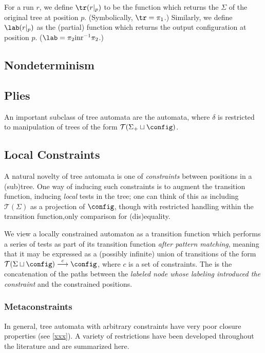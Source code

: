 For a run $r$, we define $\tr(r|_p)$ to be the function which returns the
$\Sigma$ of the original tree at position $p$. (Symbolically, $\tr =
\pi_1$.)
Similarly, we define 
$\lab(r|_p)$ as the (partial) function which returns
the output configuration at position $p$. ($\lab = \pi_2 \mbox{inr}^{-1}
\pi_2$.)

\subsection{Nondeterminism}

\subsection{Plies}

An important subclass of tree automata are the  automata,
where $\delta$ is restricted to manipulation of trees of the form
$\mathcal{T}(\Sigma_+ \sqcup \config)$.

\subsection{Local Constraints}
\label{sec:treeaut:con:loc}

A natural novelty of tree automata is one of {\em constraints} between
positions in a (sub)tree.  One way of inducing such constraints is to
augment the transition function, inducing {\em local} tests in the tree; one
can think of this as including $\mathcal{T}(\Sigma)$ as a projection of
$\config$, though with restricted handling within the transition
function,\eg only comparison for (dis)equality.

We view a locally constrained automaton as a transition function which
performs a series of tests as part of its transition function {\em after
pattern matching}, meaning that it may be expressed as a (possibly infinite)
union of transitions of the form $\mathcal{T}(\Sigma \sqcup \config)
\stackrel{c}{\longrightarrow} \config$, where $c$ is a set of constraints.
The  is the concatenation of the paths between the
{\em labeled node whose labeling introduced the constraint} and the
constrained positions.

\subsubsection{Metaconstraints}

In general, tree automata with arbitrary constraints have very poor closure
properties (see \autoref{xxx}).  A variety of restrictions have been
developed throughout the literature and are summarized here.

